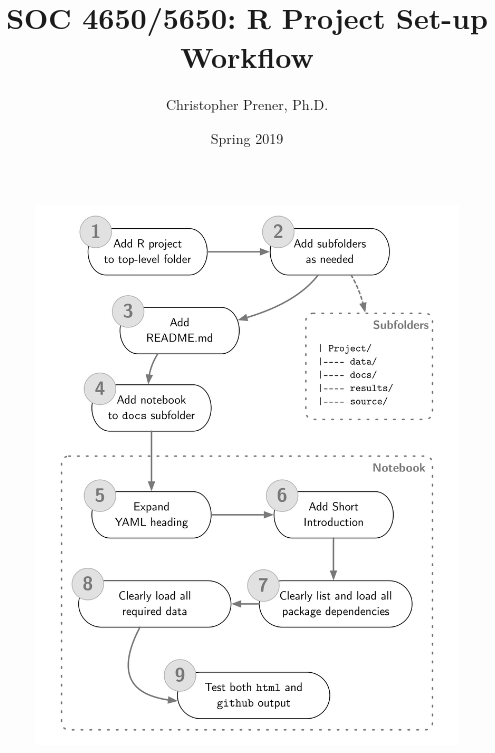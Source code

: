 \documentclass{tufte-handout}
\title{SOC 4650/5650: R Project Set-up Workflow}
\author{Christopher Prener, Ph.D.}
\date{Spring 2019}
\begin{document}
\maketitle %

\begin{fullwidth}
\begin{figure}[!h]
\includegraphics[scale=.70]{"project"}
\end{figure}
\end{fullwidth}

\end{document}
